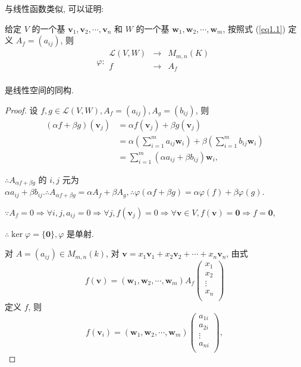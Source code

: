 \documentclass[color=black,device=normal,lang=cn,mode=geye]{elegantnote}
\begin{document}
与线性函数类似, 可以证明:
\begin{theorem}[书上的定理 2(i)]\label{t1.2}
    给定 $V$ 的一个基 $\boldsymbol{v}_1,\boldsymbol{v}_2,\cdots,\boldsymbol{v}_n$ 和 $W$ 的一个基 $\boldsymbol{w}_1,\boldsymbol{w}_2,\cdots,\boldsymbol{w}_m$, 按照式 (\ref{eq1.1}) 定义 $A_f=(a_{ij})$, 则
    \[\varphi:\begin{array}{rcl}
        \mathcal{L}(V,W) & \to & M_{m,n}(K) \\
        f & \to & A_f \\
    \end{array}\]

    是线性空间的同构.
\end{theorem}
\begin{proof}
    设 $f,g\in\mathcal{L}(V,W),A_f=(a_{ij}),A_g=(b_{ij})$, 则
    \begin{align*}
        (\alpha f+\beta g)(\boldsymbol{v}_j) & =\alpha f(\boldsymbol{v}_j)+\beta g(\boldsymbol{v}_j) \\
        & =\alpha\left(\sum\limits_{i=1}^ma_{ij}\boldsymbol{w}_i\right)+\beta\left(\sum\limits_{i=1}^mb_{ij}\boldsymbol{w}_i\right) \\
        & =\sum\limits_{i=1}^m(\alpha a_{ij}+\beta b_{ij})\boldsymbol{w}_i,
    \end{align*}
    
    $\therefore A_{\alpha f+\beta g}$ 的 $i,j$ 元为 $\alpha a_{ij}+\beta b_{ij}.\therefore A_{\alpha f+\beta g}=\alpha A_f+\beta A_g,\therefore\varphi(\alpha f+\beta g)=\alpha\varphi(f)+\beta\varphi(g)$.

    $\because A_f=0\Rightarrow\forall i,j,a_{ij}=0\Rightarrow\forall j,f(\boldsymbol{v}_j)=0\Rightarrow\forall\boldsymbol{v}\in V,f(\boldsymbol{v})=\boldsymbol{0}\Rightarrow f=\boldsymbol{0}$,

    $\therefore\ker\varphi=\{\boldsymbol{0}\},\varphi$ 是单射.

    对 $A=(a_{ij})\in M_{m,n}(k)$, 对 $\boldsymbol{v}=x_1\boldsymbol{v}_1+x_2\boldsymbol{v}_2+\cdots+x_n\boldsymbol{v}_n$, 由式
    \[f(\boldsymbol{v})=(\boldsymbol{w}_1,\boldsymbol{w}_2,\cdots,\boldsymbol{w}_m)A_f\begin{pmatrix}
        x_1 \\
        x_2 \\
        \vdots \\
        x_n \\
    \end{pmatrix}\]
    定义 $f$, 则
    \[f(\boldsymbol{v}_i)=(\boldsymbol{w}_1,\boldsymbol{w}_2,\cdots,\boldsymbol{w}_m)\begin{pmatrix}
        a_{1i} \\
        a_{2i} \\
        \vdots \\
        a_{ni} \\
    \end{pmatrix},\]


\end{proof}
\end{document}
